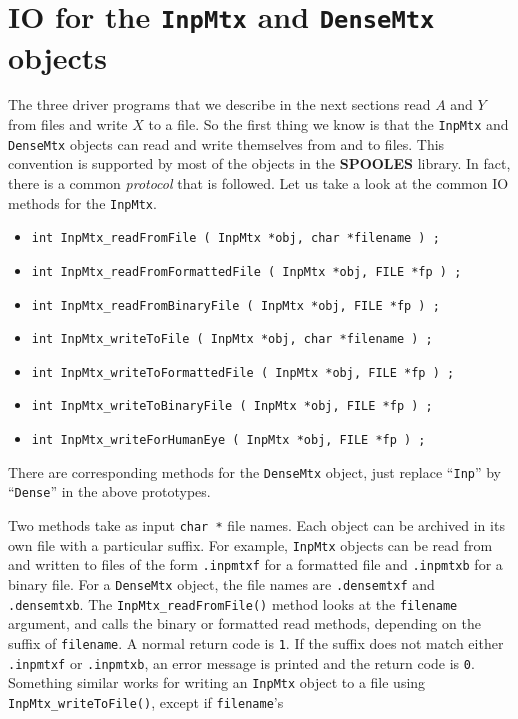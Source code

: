 \section{IO for the {\tt InpMtx} and {\tt DenseMtx} objects}
\label{subsection:IO}
\par
The three driver programs that we describe in the next sections
read $A$ and $Y$ from files and write $X$ to a file. 
So the first thing we know is that the {\tt InpMtx} and {\tt
DenseMtx} objects can read and write themselves from and to files.
This convention is supported by most of the objects in the 
{\bf SPOOLES} library. 
In fact, there is a common {\it protocol} that is followed.
Let us take a look at the common IO methods for the {\tt InpMtx}.
\begin{itemize}
\item
{\tt int InpMtx\_readFromFile ( InpMtx *obj, char *filename ) ;}
\item
{\tt int InpMtx\_readFromFormattedFile ( InpMtx *obj, FILE *fp ) ;}
\item
{\tt int InpMtx\_readFromBinaryFile ( InpMtx *obj, FILE *fp ) ;}
\item
{\tt int InpMtx\_writeToFile ( InpMtx *obj, char *filename ) ;}
\item
{\tt int InpMtx\_writeToFormattedFile ( InpMtx *obj, FILE *fp ) ;}
\item
{\tt int InpMtx\_writeToBinaryFile ( InpMtx *obj, FILE *fp ) ;}
\item
{\tt int InpMtx\_writeForHumanEye ( InpMtx *obj, FILE *fp ) ;}
\end{itemize}
There are corresponding methods for the {\tt DenseMtx} object,
just replace ``{\tt Inp}'' by ``{\tt Dense}'' in the above prototypes.
\par
Two methods take as input {\tt char *} file names. Each object can
be archived in its own file with a particular suffix.
For example, {\tt InpMtx} objects can be read from and written to
files of the form {\tt *.inpmtxf} for a formatted file and
{\tt *.inpmtxb} for a binary file.
For a {\tt DenseMtx} object, the file names are
{\tt *.densemtxf} and {\tt *.densemtxb}.
The {\tt InpMtx\_readFromFile()} method looks at the {\tt filename}
argument, and calls the binary or formatted read methods, depending on
the suffix of {\tt filename}. 
A normal return code is {\tt 1}.
If the suffix does not match either {\tt *.inpmtxf} or {\tt *.inpmtxb},
an error message is printed and the return code is {\tt 0}.
Something similar works for writing an {\tt InpMtx} object to a
file using {\tt InpMtx\_writeToFile()}, except if {\tt filename}'s
